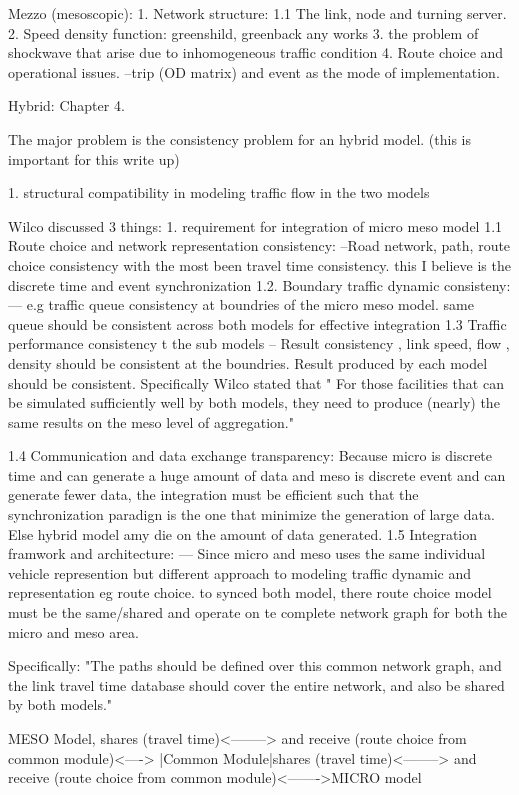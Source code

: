 \begin{bibunit}[plainnat]
Mezzo (mesoscopic):
1. Network structure:
1.1 The link, node and turning server.
2. Speed density function: greenshild, greenback any works
3. the problem of shockwave that arise due to inhomogeneous traffic condition
4. Route choice and operational issues. 
--trip (OD matrix) and event as the mode of implementation. 

Hybrid: Chapter 4.

The major problem is the consistency problem for an hybrid model. (this is important for this write up)
 
1. structural compatibility in modeling traffic flow in the two models

Wilco discussed 3 things:
1. requirement for integration of micro meso model
1.1 Route choice and network representation consistency: 
--Road network, path, route choice consistency with the most been travel time consistency. 
this I believe is the discrete time and event synchronization
1.2. Boundary traffic dynamic consisteny: 
--- e.g traffic queue consistency at boundries of the micro meso model.
same queue should be consistent across both models for effective integration
1.3 Traffic performance consistency t the sub models
-- Result consistency , link speed, flow , density should be consistent at 
the boundries. Result produced by each model should be consistent. Specifically 
Wilco stated that " For those facilities that can be simulated sufficiently well by both models, they need to produce
(nearly) the same results on the meso level of aggregation."

1.4 Communication and data exchange transparency:
Because micro is discrete time and can generate a huge amount of data 
and meso is discrete event and can generate fewer data, the integration must be
efficient such that the synchronization paradign is the one that minimize
the generation of large data. Else hybrid model amy die on the amount of data generated. 
1.5 Integration framwork and architecture:
---
Since micro and meso uses the same individual vehicle represention but different 
approach to modeling traffic dynamic and representation eg route choice. 
to synced both model, there route choice model must be the same/shared and operate on te 
complete network graph for both the micro and meso area.  

Specifically: "The paths
should be defined over this common network graph, and the link travel time
database should cover the entire network, and also be shared by both models."

  
MESO Model, shares (travel time)<--------> and receive (route choice from common module)<----> |Common Module|shares (travel time)<--------> and receive (route choice from common module)<------->MICRO model



\end{bibunit}
